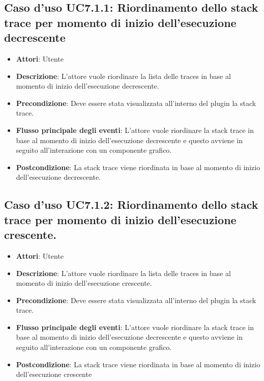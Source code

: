 \subsection{Caso d'uso UC7.1.1: Riordinamento dello stack trace per momento di inizio dell'esecuzione decrescente}
\begin{itemize}
\item \textbf{Attori}: Utente
\item \textbf{Descrizione}: L'attore vuole riordinare la lista delle traces in base al momento di inizio dell'esecuzione decrescente.
\item \textbf{Precondizione}: Deve essere stata visualizzata all'interno del plugin la stack trace.
\item \textbf{Flusso principale degli eventi}: L'attore vuole riordinare la stack trace in base al momento di inizio dell'esecuzione decrescente e questo avviene in seguito all'interazione con un componente grafico.
\item \textbf{Postcondizione}: La stack trace viene riordinata in base al momento di inizio dell'esecuzione decrescente.
\end{itemize}
\subsection{Caso d'uso UC7.1.2: Riordinamento dello stack trace per momento di inizio dell'esecuzione crescente.}
\begin{itemize}
\item \textbf{Attori}: Utente
\item \textbf{Descrizione}: L'attore vuole riordinare la lista delle traces in base al momento di inizio dell'esecuzione crescente.
\item \textbf{Precondizione}: Deve essere stata visualizzata all'interno del plugin la stack trace.
\item \textbf{Flusso principale degli eventi}: L'attore vuole riordinare la stack trace in base al momento di inizio dell'esecuzione decrescente e questo avviene in seguito all'interazione con un componente grafico.
\item \textbf{Postcondizione}: La stack trace viene riordinata in base al momento di inizio dell'esecuzione crescente
\end{itemize}
